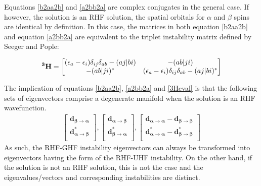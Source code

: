 \documentclass{revtex4}
\newcommand{\AtoB}{\mathbf{\alpha\rightarrow\beta}}
\newcommand{\BtoA}{\mathbf{\beta\rightarrow\alpha}}
\newcommand{\AtoA}{\mathbf{\alpha\rightarrow\alpha}}
\newcommand{\BtoB}{\mathbf{\beta\rightarrow\beta}}
\newcommand{\e}{\textcolor{myred}{\left(\epsilon_a-\epsilon_i\right)}}
\newcommand{\diag}{\textcolor{myred}{\delta_{ij}\delta_{ab}}}
\begin{document}
Equations \ref{b2aa2b} and \ref{a2bb2a} are complex conjugates in the general case. If however, 
the solution is an RHF solution, the spatial orbitals for $\alpha$ and $\beta$ spins are identical
by definition. In this case, the matrices in both equation \ref{b2aa2b} and equation \ref{a2bb2a}
are equivalent to the triplet instability matrix defined by Seeger and Pople:

\begin{eqnarray}
  \mathbf{{}^3H} =
  \begin{bmatrix}
    \e \diag - (aj|bi) & -(ab | ji )           \\
    -(ab | ji )^*        & \e \diag - (aj|bi)^* \\        
  \end{bmatrix} 
\end{eqnarray}

The implication of equations \ref{b2aa2b}, \ref{a2bb2a} and \ref{3Heval} is that the following 
sets of eigenvectors comprise a degenerate manifold when the solution is an RHF wavefunction.
\begin{eqnarray}
  \begin{bmatrix}
    \mathbf{d_\BtoA} \\
    \mathbf{d^*_\AtoB} \\        
  \end{bmatrix}
  , 
  \begin{bmatrix}
    \mathbf{d_\AtoB} \\
    \mathbf{d^*_\BtoA} \\        
  \end{bmatrix}
  ,
  \begin{bmatrix}
    \mathbf{d_\AtoA - d_\BtoB} \\
    \mathbf{d^*_\AtoA - d^*_\BtoB} \\        
  \end{bmatrix}
\end{eqnarray}
As such, the RHF-GHF instability eigenvectors can always be transformed into eigenvectors having the
form of the RHF-UHF instability. On the other hand, if the solution is not an RHF solution, this is
not the case and the eigenvalues/vectors and corresponding instabilities are distinct.  
\end{document}
